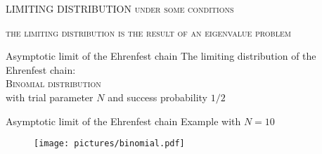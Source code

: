 \documentclass[usenames,dvipsnames]{beamer}
\begin{document}
  \begin{frame}{LIMITING DISTRIBUTION}
    \centering
      \vspace{30pt}
      \textsc{under some conditions}

      \vspace{10pt}
      \Large
      \textsc{\alert{the limiting distribution is the result of an eigenvalue problem}}
  \end{frame}




    


  \begin{frame}{Asymptotic limit of the Ehrenfest chain}
    \Large 
    \centering
    \vspace{20pt}
    The limiting distribution of the Ehrenfest chain:\\
    \vspace{30pt}
    \textsc{\alert{Binomial distribution}}\\
    \vspace{30pt}
    \normalsize
    with trial parameter \alert{$N$} and success probability \alert{$1/2$}
  \end{frame}
  
  \begin{frame}{Asymptotic limit of the Ehrenfest chain}
    \vspace{30pt}
    Example with $N = 10$
    \begin{figure}
      \texttt{[image: pictures/binomial.pdf]}
    \end{figure}
  \end{frame}
\end{document}
